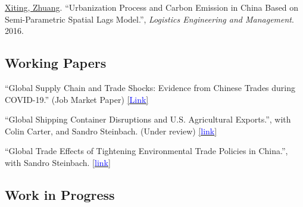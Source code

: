 \documentclass[11 pt,letterpaper]{article}
\renewenvironment{itemize}{
	\begin{list}{}{
			\setlength{\leftmargin}{1.5em}
		}
	}{
	\end{list}
}
\begin{document}
\begin{itemize}
		 \item[-]	\underline{Xiting, Zhuang}. ``Urbanization Process and Carbon Emission in China Based on Semi-Parametric Spatial Lags Model.'',   \textit{Logistics Engineering and Management}. 2016. 
 

 	
 
		\end{itemize}
	
 
		
		
		
		
	\subsection*{\textbf{Working Papers}}
	
	\begin{itemize}
	

\item[-]	``Global Supply Chain and Trade Shocks: Evidence from Chinese Trades during COVID-19.'' (Job Market Paper)
\href{https://xiting-zhuang.github.io/file/jmp.pdf}{[{\underline{\textcolor{blue}{Link}}}]}  




	 \item[-]	``Global Shipping Container Disruptions and U.S. Agricultural Exports.'',  with Colin Carter, and Sandro Steinbach.  (Under review)
	  	\href{http://dx.doi.org/10.22004/ag.econ.320397}{[{\underline{\textcolor{blue}{link}}}]}
	
	
 
 

 
	
 		
	 \item[-] ``Global Trade Effects of Tightening Environmental Trade Policies in China.'', with Sandro Steinbach. 
\href{https://www.dropbox.com/scl/fi/21o4ldsv04zo4w7bs6y5w/Manuscript.pdf?rlkey=phzrh7uhti8zm0wxpn786gu94&dl=0}{[{\underline{\textcolor{blue}{link}}}]}

 

	\end{itemize}
	
 
 \subsection*{\textbf{ Work in Progress}}
 
\end{document}
